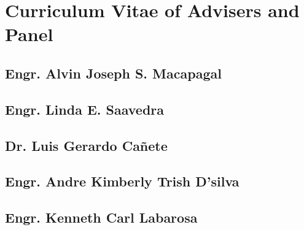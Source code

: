 \chapter{Curriculum Vitae of Advisers and Panel}
\label{app:cv_professors}


\section*{Engr. Alvin Joseph S. Macapagal}

\section*{Engr. Linda E. Saavedra}

\section*{Dr. Luis Gerardo Ca\~{n}ete}

\section*{Engr. Andre Kimberly Trish D'silva}

\section*{Engr. Kenneth Carl Labarosa}
